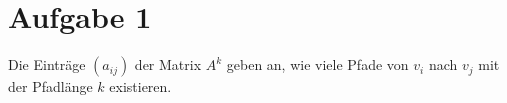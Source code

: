 \section*{Aufgabe 1}

Die Einträge $(a_{ij})$ der Matrix $A^k$ geben an, wie viele Pfade von $v_i$ nach $v_j$ mit der Pfadlänge $k$ existieren.